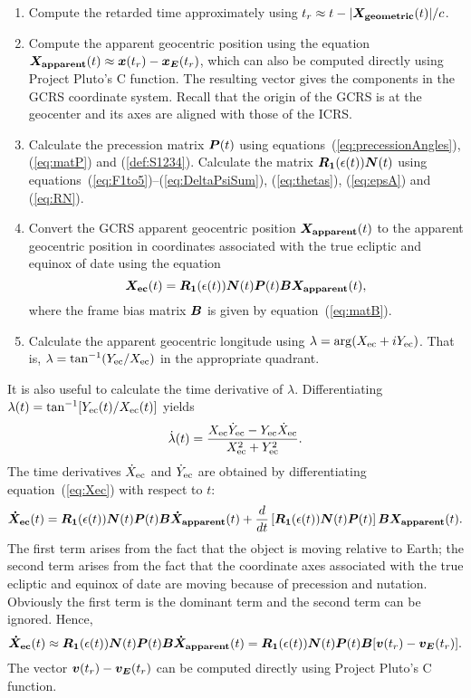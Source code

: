 \documentclass[12pt]{article}
\newcommand \beq {\begin{equation}}
\newcommand \eeq {\end{equation}}
\newcommand{\ve}[1]{\mbox{\boldmath $#1$}}
\begin{document}
\begin{CJK}{UTF8}{bkai}
\begin{enumerate}
\item Compute the retarded time approximately using 
$t_r \approx t - |\ve{X_{\rm geometric}}(t)|/c$.

\item Compute the apparent geocentric position using the equation 
$\ve{X_{\rm apparent}}(t) \approx \ve{x}(t_r) - \ve{x_E}(t_r)$, which can 
also be computed directly using Project Pluto's C function. 
The resulting vector gives the components in the GCRS coordinate system. 
Recall that the origin of the GCRS is at the geocenter and its axes 
are aligned with those of the ICRS.

\item Calculate the precession matrix $\ve{P}(t)$ using 
equations~(\ref{eq:precessionAngles}), (\ref{eq:matP}) and (\ref{def:S1234}). 
Calculate the matrix $\ve{R_1}(\epsilon(t)) \ve{N}(t)$ using 
equations~(\ref{eq:F1to5})--(\ref{eq:DeltaPsiSum}), (\ref{eq:thetas}), (\ref{eq:epsA}) 
and (\ref{eq:RN}).

\item Convert the GCRS apparent geocentric position $\ve{X_{\rm apparent}}(t)$ to 
the apparent geocentric position in coordinates associated with the 
true ecliptic and equinox of date using the equation 
\beq
  \ve{X_{\rm ec}}(t) = \ve{R_1}(\epsilon(t)) \ve{N}(t) \ve{P}(t) \ve{B} 
\ve{X_{\rm apparent}}(t) ,
\label{eq:Xec}
\eeq
where the frame bias matrix $\ve{B}$ is given by equation~(\ref{eq:matB}).

\item Calculate the apparent geocentric longitude using 
$\lambda = {\rm arg}(X_{\rm ec} + i Y_{\rm ec})$. That is, 
$\lambda = \tan^{-1}(Y_{\rm ec}/X_{\rm ec})$ in the appropriate quadrant.
\end{enumerate}

It is also useful to calculate the time derivative of $\lambda$. Differentiating 
$\lambda(t)=\tan^{-1}[Y_{\rm ec}(t)/X_{\rm ec}(t)]$ yields
\beq
  \dot{\lambda}(t) = \frac{X_{\rm ec} \dot{Y}_{\rm ec} - Y_{\rm ec} \dot{X}_{\rm ec}}
{X_{\rm ec}^2 + Y_{\rm ec}^2}  .
\eeq
The time derivatives $\dot{X}_{\rm ec}$ and $\dot{Y}_{\rm ec}$ are obtained by 
differentiating equation~(\ref{eq:Xec}) with respect to $t$:
\beq
  \ve{\dot{X}_{\rm ec}}(t) = \ve{R_1}(\epsilon(t)) \ve{N}(t) \ve{P}(t) \ve{B} 
\ve{\dot{X}_{\rm apparent}}(t) + \frac{d}{dt}\left[\ve{R_1}(\epsilon(t)) \ve{N}(t) \ve{P}(t) 
\right] \ve{B} \ve{X_{\rm apparent}}(t) .
\label{eq:dXec_dt}
\eeq
The first term arises from the fact that the object is moving relative to Earth; 
the second term arises from the fact that the coordinate axes associated with  
the true ecliptic and equinox of date are moving because of precession and 
nutation. Obviously the first term is the dominant term and the second term can be 
ignored. Hence, 
\beq
  \ve{\dot{X}_{\rm ec}}(t) \approx \ve{R_1}(\epsilon(t)) \ve{N}(t) \ve{P}(t) \ve{B}
\ve{\dot{X}_{\rm apparent}}(t) = \ve{R_1}(\epsilon(t)) \ve{N}(t) \ve{P}(t) \ve{B} 
[\ve{v}(t_r) - \ve{v_E}(t_r)] .
\eeq
The vector $\ve{v}(t_r) - \ve{v_E}(t_r)$ can be computed directly using Project Pluto's C 
function.


\end{CJK}
\end{document}
